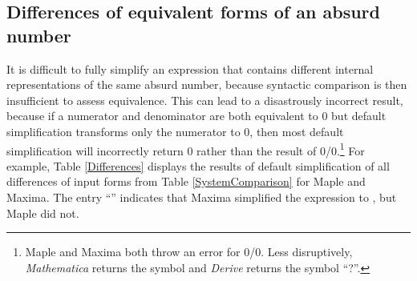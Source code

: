 \documentclass[12pt,english]{article}
\theoremstyle{definition}
\theoremstyle{remark}
\theoremstyle{plain}
\theoremstyle{plain}
\begin{document}
\subsection{Differences of equivalent forms of an absurd number }

It is difficult to fully simplify an expression that contains different
internal representations of the same absurd number, because syntactic
comparison is then insufficient to assess equivalence. This can lead
to a disastrously incorrect result, because if a numerator and denominator
are both equivalent to 0 but default simplification transforms only
the numerator to 0, then most default simplification will incorrectly
return 0 rather than the result of 0/0.\footnote{Maple and Maxima both throw an error for 0/0. Less disruptively, \textsl{Mathematica}
returns the symbol  and \textsl{Derive} returns
the symbol ``?''.} For example, Table \ref{Differences} displays the results of default
simplification of all differences of input forms from Table \ref{SystemComparison}
for Maple and Maxima. The entry ``'' indicates
that Maxima simplified the expression to , but Maple
did not.
\end{document}
